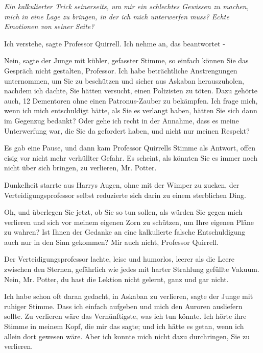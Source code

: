 \emph{Ein kalkulierter Trick seinerseits, um mir ein schlechtes Gewissen zu
machen, mich in eine Lage zu bringen, in der ich mich unterwerfen muss? Echte
Emotionen von seiner Seite?}

\glqq{}Ich verstehe\grqq{}, sagte Professor Quirrell. \glqq{}Ich nehme an, das
beantwortet -\grqq{}

\glqq{}Nein\grqq{}, sagte der Junge mit kühler, gefasster Stimme, \glqq{}so
einfach können Sie das Gespräch nicht gestalten, Professor. Ich habe
beträchtliche Anstrengungen unternommen, um Sie zu beschützen und sicher aus
Askaban herauszuholen, nachdem ich dachte, Sie hätten versucht, einen Polizisten
zu töten. Dazu gehörte auch, 12 Dementoren ohne einen Patronus-Zauber zu
bekämpfen. Ich frage mich, wenn ich mich entschuldigt hätte, als Sie es verlangt
haben, hätten Sie sich dann im Gegenzug bedankt? Oder gehe ich recht in der
Annahme, dass es meine Unterwerfung war, die Sie da gefordert haben, und nicht
nur meinen Respekt?\grqq{}

Es gab eine Pause, und dann kam Professor Quirrells Stimme als Antwort, offen
eisig vor nicht mehr verhüllter Gefahr. \glqq{}Es scheint, als könnten Sie es
immer noch nicht über sich bringen, zu verlieren, Mr. Potter.\grqq{}

Dunkelheit starrte aus Harrys Augen, ohne mit der Wimper zu zucken, der
Verteidigungsprofessor selbst reduzierte sich darin zu einem sterblichen Ding.

\glqq{}Oh, und überlegen Sie jetzt, ob Sie so tun sollen, als würden Sie gegen
mich verlieren und sich vor meinem eigenen Zorn zu schützen, um Ihre eigenen
Pläne zu wahren? Ist Ihnen der Gedanke an eine kalkulierte falsche
Entschuldigung auch nur in den Sinn gekommen? Mir auch nicht, Professor
Quirrell.\grqq{}

Der Verteidigungsprofessor lachte, leise und humorlos, leerer als die Leere
zwischen den Sternen, gefährlich wie jedes mit harter Strahlung gefüllte Vakuum.
\glqq{}Nein, Mr. Potter, du hast die Lektion nicht gelernt, ganz und gar
nicht.\grqq{}

\glqq{}Ich habe schon oft daran gedacht, in Askaban zu verlieren\grqq{}, sagte
der Junge mit ruhiger Stimme. \glqq{}Dass ich einfach aufgeben und mich den
Auroren ausliefern sollte. Zu verlieren wäre das Vernünftigste, was ich tun
könnte. Ich hörte ihre Stimme in meinem Kopf, die mir das sagte; und ich hätte
es getan, wenn ich allein dort gewesen wäre. Aber ich konnte mich nicht dazu
durchringen, Sie zu verlieren.\grqq{}

